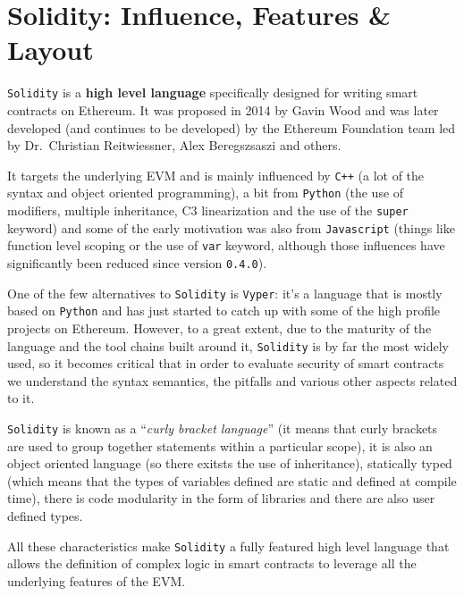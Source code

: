 \section{Solidity: Influence, Features \&
Layout}\label{solidity-influence-features-layout}

\texttt{Solidity} is a \textbf{high level language} specifically
designed for writing smart contracts on Ethereum. It was proposed in
2014 by Gavin Wood and was later developed (and continues to be
developed) by the Ethereum Foundation team led by Dr.~Christian
Reitwiessner, Alex Beregszsaszi and others.

It targets the underlying EVM and is mainly influenced by \texttt{C++}
(a lot of the syntax and object oriented programming), a bit from
\texttt{Python} (the use of modifiers, multiple inheritance, C3
linearization and the use of the \texttt{super} keyword) and some of the
early motivation was also from \texttt{Javascript} (things like function
level scoping or the use of \texttt{var} keyword, although those
influences have significantly been reduced since version
\texttt{0.4.0}).

One of the few alternatives to \texttt{Solidity} is \texttt{Vyper}: it's
a language that is mostly based on \texttt{Python} and has just started
to catch up with some of the high profile projects on Ethereum. However,
to a great extent, due to the maturity of the language and the tool
chains built around it, \texttt{Solidity} is by far the most widely
used, so it becomes critical that in order to evaluate security of smart
contracts we understand the syntax semantics, the pitfalls and various
other aspects related to it.

\texttt{Solidity} is known as a ``\emph{curly bracket language}'' (it
means that curly brackets are used to group together statements within a
particular scope), it is also an object oriented language (so there
exitsts the use of inheritance), statically typed (which means that the
types of variables defined are static and defined at compile time),
there is code modularity in the form of libraries and there are also
user defined types.

All these characteristics make \texttt{Solidity} a fully featured high
level language that allows the definition of complex logic in smart
contracts to leverage all the underlying features of the EVM.

